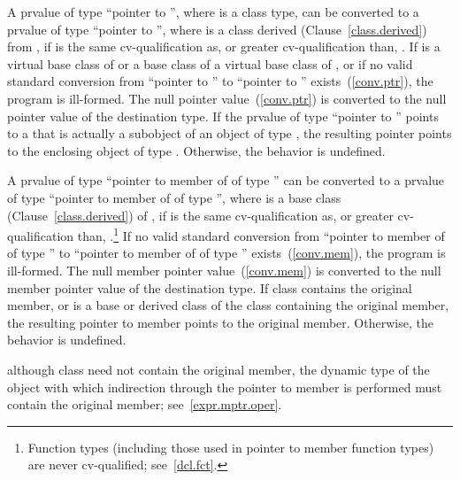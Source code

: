 \pnum
{}%
%
A prvalue of type ``pointer to  '', where 
is a class type, can be converted to a prvalue of type ``pointer to
 '', where  is a class derived
(Clause~\ref{class.derived}) from ,
if  is the same cv-qualification as,
or greater cv-qualification than, .
If  is a virtual base class of  or
a base class of a virtual base class of , or
if no valid standard conversion from ``pointer to ''
to ``pointer to '' exists~(\ref{conv.ptr}), the program is ill-formed. 
The null pointer value~(\ref{conv.ptr}) is converted
to the null pointer value of the destination type. If the prvalue of type
``pointer to  '' points to a  that is
actually a subobject of an object of type , the resulting
pointer points to the enclosing object of type . Otherwise, the
behavior is undefined.

\pnum
{}%
A prvalue of type ``pointer to member of  of type 
'' can be converted to a prvalue of type ``pointer to member of
 of type  '', where  is a base
class (Clause~\ref{class.derived}) of ,
if  is the same cv-qualification
as, or greater cv-qualification than, .\footnote{Function types
(including those used in pointer to member function
types) are never cv-qualified; see~\ref{dcl.fct}.}
If no valid standard conversion
from ``pointer to member of  of type ''
to ``pointer to member of  of type ''
exists~(\ref{conv.mem}), the program is ill-formed.
The null member pointer value~(\ref{conv.mem}) is converted to the null
member pointer value of the destination type. If class 
contains the original member, or is a base or derived class of the class
containing the original member, the resulting pointer to member points
to the original member. Otherwise, the behavior is undefined.
\begin{note}
although class  need not contain the original member, the
dynamic type of the object with which indirection through the pointer
to member is performed must contain the original member;
see~\ref{expr.mptr.oper}.
\end{note}

